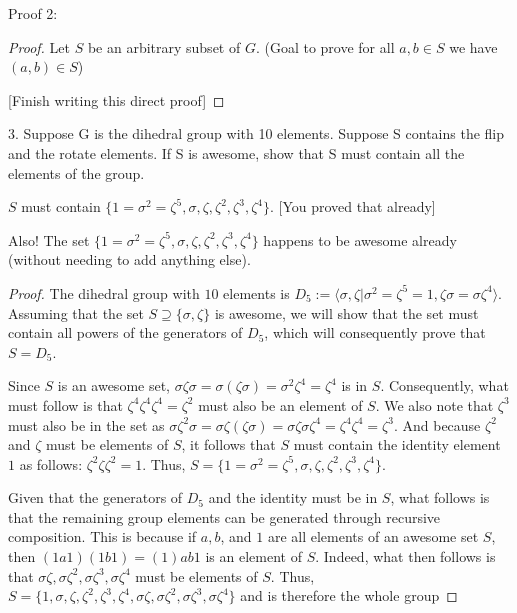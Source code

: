 \documentclass[a4paper,12pt]{article}
\begin{document}
Proof 2:
\begin{proof}
Let $S$ be an arbitrary subset of $G$.  (Goal to prove for all $a,b \in S$ we have $(a,b) \in S$)

[Finish writing this direct proof]



\end{proof}

3. Suppose G is the dihedral group with 10 elements.  Suppose S contains the flip and the rotate elements.  If S is awesome, show that S must contain all the elements of the group.

$S$ must contain $ \{1=\sigma^2=\zeta^5, \sigma, \zeta, \zeta^2, \zeta^3, \zeta^4\}.$  [You proved that already]

Also!  The set $ \{1=\sigma^2=\zeta^5, \sigma, \zeta, \zeta^2, \zeta^3, \zeta^4\}$ happens to be awesome already (without needing to add anything else).

\begin{proof}
    The dihedral group with $10$ elements is $D_5 := \langle \sigma, \zeta | \sigma^2 = \zeta^5 = 1, \zeta\sigma = \sigma\zeta^4 \rangle$. Assuming that the set $S \supseteq \{\sigma, \zeta\}$ is awesome, we will show that the set must contain all powers of the generators of $D_5$, which will consequently prove that $S = D_5$.

    Since $S$ is an awesome set, $\sigma \zeta \sigma = \sigma (\zeta \sigma) = \sigma^2 \zeta ^4 = \zeta^4$ is in $S$. Consequently, what must follow is that $\zeta^4 \zeta^4 \zeta^4 = \zeta^2$ must also be an element of $S$. We also note that $\zeta^3$ must also be in the set as $\sigma\zeta^2 \sigma = \sigma \zeta (\zeta \sigma) = \sigma \zeta\sigma \zeta^4 = \zeta^4 \zeta^4 = \zeta^3$. And because $\zeta^2$ and $\zeta$ must be elements of $S$, it follows that $S$ must contain the identity element $1$ as follows: $\zeta^2 \zeta \zeta^2 = 1$. Thus, $S = \{1=\sigma^2=\zeta^5, \sigma, \zeta, \zeta^2, \zeta^3, \zeta^4\}.$

    Given that the generators of $D_5$ and the identity must be in $S$, what follows is that the remaining group elements can be generated through recursive composition. This is because if $a, b$, and $1$ are all elements of an awesome set $S$, then $(1a1)(1b1) = (1) ab 1$ is an element of $S$. Indeed, what then follows is that $\sigma \zeta, \sigma \zeta^2, \sigma \zeta^3, \sigma \zeta^4$ must be elements of $S$. Thus, $S = \{1, \sigma, \zeta, \zeta^2, \zeta^3, \zeta^4, \sigma \zeta, \sigma \zeta^2, \sigma \zeta^3, \sigma \zeta^4\}$ and is therefore the whole group

\end{proof}
\end{document}
